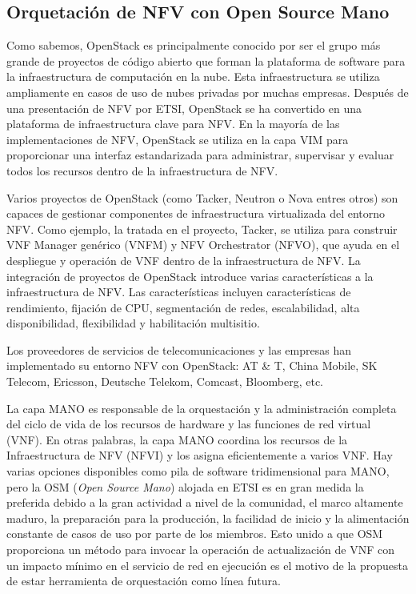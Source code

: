 \subsection{Orquetación de NFV con Open Source Mano}
Como sabemos, OpenStack es principalmente conocido por ser el grupo más grande de proyectos de código abierto que forman la plataforma de software para la infraestructura de computación en la nube. Esta infraestructura se utiliza ampliamente en casos de uso de nubes privadas por muchas empresas. Después de una presentación de NFV por ETSI, OpenStack se ha convertido en una plataforma de infraestructura clave para NFV. En la mayoría de las implementaciones de NFV, OpenStack se utiliza en la capa VIM  para proporcionar una interfaz estandarizada para administrar, supervisar y evaluar todos los recursos dentro de la infraestructura de NFV.

Varios proyectos de OpenStack (como Tacker, Neutron o Nova entres otros) son capaces de gestionar componentes de infraestructura virtualizada del entorno NFV. Como ejemplo, la tratada en el proyecto, Tacker, se utiliza para construir VNF Manager genérico (VNFM) y NFV Orchestrator (NFVO), que ayuda en el despliegue y operación de VNF dentro de la infraestructura de NFV. La integración de proyectos de OpenStack introduce varias características a la infraestructura de NFV. Las características incluyen características de rendimiento, fijación de CPU, segmentación de redes, escalabilidad, alta disponibilidad, flexibilidad y habilitación multisitio.

Los proveedores de servicios de telecomunicaciones y las empresas han implementado su entorno NFV con OpenStack: AT \& T, China Mobile, SK Telecom, Ericsson, Deutsche Telekom, Comcast, Bloomberg, etc.

La capa MANO es responsable de la orquestación y la administración completa del ciclo de vida de los recursos de hardware y las funciones de red virtual (VNF). En otras palabras, la capa MANO coordina los recursos de la Infraestructura de NFV (NFVI) y los asigna eficientemente a varios VNF. Hay varias opciones disponibles como pila de software tridimensional para MANO, pero la OSM (\textit{Open Source Mano}) alojada en ETSI es en gran medida la preferida debido a la gran actividad a nivel de la comunidad, el marco altamente maduro, la preparación para la producción, la facilidad de inicio y la alimentación constante de casos de uso por parte de los miembros. Esto unido a que OSM proporciona un método para invocar la operación de actualización de VNF con un impacto mínimo en el servicio de red en ejecución es el motivo de la propuesta de estar herramienta de orquestación como línea futura.

